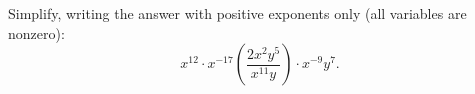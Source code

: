 Simplify, writing the answer with positive exponents only (all variables are nonzero):
\[
x^{12}\cdot x^{-17}\left(\dfrac{2x^2y^5}{x^{11}y}\right)\cdot x^{-9}y^7 .
\]
